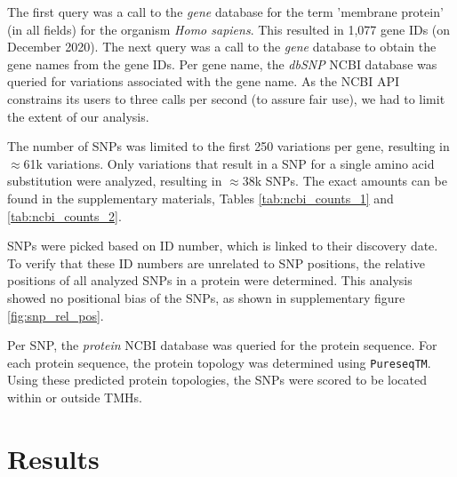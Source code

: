 
The first query was a call to the \emph{gene} database for the 
term 'membrane protein' (in all fields) 
for the organism \emph{Homo sapiens}.
This resulted in 1,077 gene IDs (on December 2020).
The next query was a call to the \emph{gene} database 
to obtain the gene names from the gene IDs.
Per gene name, the \emph{dbSNP} NCBI database was queried for 
variations associated with the gene name. 
As the NCBI API constrains its users to three calls per second
(to assure fair use), we had to limit the extent of our analysis.

The number of SNPs was limited to the first 250 variations per gene,
resulting in $\approx$61k variations.
Only variations that result in a SNP for
a single amino acid substitution were analyzed, resulting in $\approx$38k SNPs.
The exact amounts can be found in the supplementary materials,
Tables \ref{tab:ncbi_counts_1} and \ref{tab:ncbi_counts_2}.

%
SNPs were picked based on ID number, which is linked to their discovery date. To verify that these ID numbers are unrelated to SNP positions, the relative positions of all analyzed SNPs in a protein were determined. This analysis showed no positional bias of the SNPs, as shown in supplementary figure \ref{fig:snp_rel_pos}.

Per SNP, the \emph{protein} NCBI database was queried for the
protein sequence. For each protein sequence, the protein topology was determined using \verb;PureseqTM;. Using these predicted protein topologies, the SNPs were scored to be located within or outside TMHs.


\section{Results}

